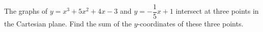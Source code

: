 The graphs of $y = x^3 +5x^2 +4x-3$ and $y = -\dfrac{1}{5} x+1$ intersect at three points in the Cartesian plane. Find the sum of the $y$-coordinates of these three points.
